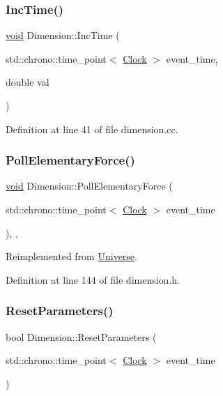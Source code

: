 \subsubsection{\texorpdfstring{Inc\+Time()}{IncTime()}}
{\footnotesize\ttfamily \mbox{\hyperlink{glad_8h_a950fc91edb4504f62f1c577bf4727c29}{void}} Dimension\+::\+Inc\+Time (\begin{DoxyParamCaption}\item[{std\+::chrono\+::time\+\_\+point$<$ \mbox{\hyperlink{universe_8h_a0ef8d951d1ca5ab3cfaf7ab4c7a6fd80}{Clock}} $>$}]{event\+\_\+time,  }\item[{double}]{val }\end{DoxyParamCaption})}



Definition at line 41 of file dimension.\+cc.

\mbox{\label{class_dimension_a5b07f5c8558233c8f3488baf1fe3459a}} 
\subsubsection{\texorpdfstring{Poll\+Elementary\+Force()}{PollElementaryForce()}}
{\footnotesize\ttfamily \mbox{\hyperlink{glad_8h_a950fc91edb4504f62f1c577bf4727c29}{void}} Dimension\+::\+Poll\+Elementary\+Force (\begin{DoxyParamCaption}\item[{std\+::chrono\+::time\+\_\+point$<$ \mbox{\hyperlink{universe_8h_a0ef8d951d1ca5ab3cfaf7ab4c7a6fd80}{Clock}} $>$}]{event\+\_\+time }\end{DoxyParamCaption})\hspace{0.3cm}{\ttfamily [inline]}, {\ttfamily [final]}, {\ttfamily [virtual]}}



Reimplemented from \mbox{\hyperlink{class_universe_a0c485c504542409cbb5cfd8543c35b11}{Universe}}.



Definition at line 144 of file dimension.\+h.

\mbox{\label{class_dimension_af83732dba929ae01aca457e7d6121374}} 
\subsubsection{\texorpdfstring{Reset\+Parameters()}{ResetParameters()}}
{\footnotesize\ttfamily bool Dimension\+::\+Reset\+Parameters (\begin{DoxyParamCaption}\item[{std\+::chrono\+::time\+\_\+point$<$ \mbox{\hyperlink{universe_8h_a0ef8d951d1ca5ab3cfaf7ab4c7a6fd80}{Clock}} $>$}]{event\+\_\+time }\end{DoxyParamCaption})}



